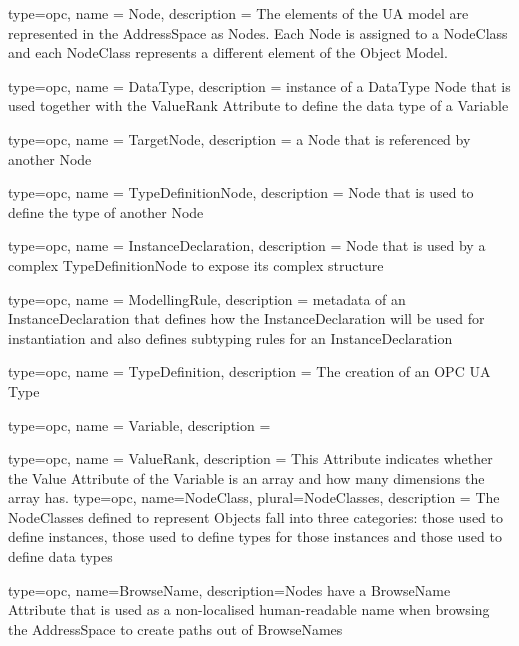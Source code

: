 


{
  type=opc,
  name = {Node},
  description = {The elements of the UA model are represented in the AddressSpace as Nodes. Each Node is assigned to a NodeClass and each NodeClass represents a different element of the Object Model.}
}

{
  type=opc,
  name = {DataType},
  description = {instance of a DataType Node that is used together with the ValueRank Attribute to define the data type of a Variable}
}

{
  type=opc,
  name = {TargetNode},
  description = {a Node that is referenced by another Node}
}

{
  type=opc,
  name = {TypeDefinitionNode},
  description = {Node that is used to define the type of another Node}
}


{
  type=opc,
  name = {InstanceDeclaration},
  description = {Node that is used by a complex \gls{TypeDefinitionNode} to expose its complex structure}
}

{
  type=opc,
  name = {ModellingRule},
  description = {metadata of an InstanceDeclaration that defines how the \gls{InstanceDeclaration} will be used for instantiation and also defines subtyping rules for an \gls{InstanceDeclaration}}
}

{
  type=opc,
  name = {TypeDefinition},
  description = {The creation of an OPC UA Type}
}

{
  type=opc,
  name = {Variable},
  description = {}
}

{
  type=opc,
  name = {ValueRank},
  description = {This Attribute indicates whether the Value Attribute of the Variable is an array and how many dimensions the array has.}
}
{
  type=opc,
  name=NodeClass,
  plural=NodeClasses,
  description = {The NodeClasses defined to represent Objects fall into three categories: those used to define instances, those used to define types for those instances and those used to define data types}
}

{
    type=opc,
    name=BrowseName,
    description={Nodes have a BrowseName Attribute that is used as a non-localised human-readable name when browsing the AddressSpace to create paths out of BrowseNames}
}


